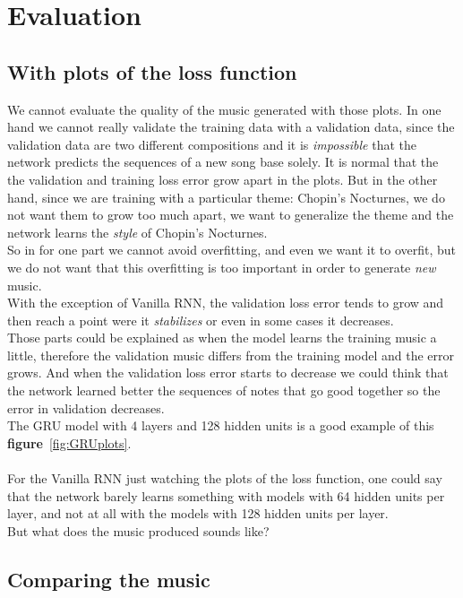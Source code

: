 \documentclass[11pt]
{article}
\begin{document}
\section{Evaluation}

\subsection{With plots of the loss function}
We cannot evaluate the quality of the music generated with those plots.
In one hand we cannot really validate the training data with a validation data, since the validation data are two different compositions and it is \textit{impossible} that the network predicts the sequences of a new song base solely.
It is normal that the the validation and training loss error grow apart in the plots.
But in the other hand, since we are training with a particular theme: Chopin's Nocturnes, we do not want them to grow too much apart, we want to generalize the theme and the network learns the \textit{style} of Chopin's Nocturnes.\\
So in for one part we cannot avoid overfitting, and even we want it to overfit, but we do not want that this overfitting is too important in order to generate \textit{new} music.
\\

With the exception of Vanilla RNN, the validation loss error tends to grow and then reach a point were it \textit{stabilizes} or even in some cases it decreases.\\
Those parts could be explained as when the model learns the training music a little, therefore the validation music differs from the training model and the error grows.
And when the validation loss error starts to decrease we could think that the network learned better the sequences of notes that go good together so the error in validation decreases.\\
The GRU model with 4 layers and 128 hidden units is a good example of this \textbf{figure}~\ref{fig:GRUplots}.\\
\\
For the Vanilla RNN just watching the plots of the loss function, one could say that the network barely learns something with models with 64 hidden units per layer, and not at all with the models with 128 hidden units per layer.\\
But what does the music produced sounds like?


\subsection{Comparing the music}
\end{document}
